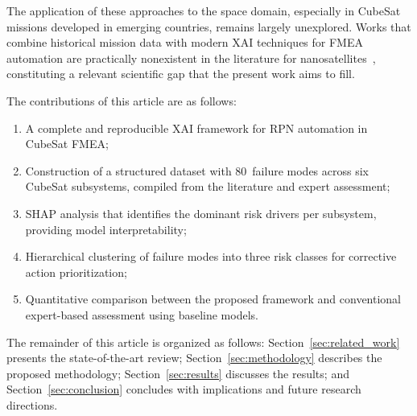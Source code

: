 The application of these approaches to the space domain, especially in CubeSat missions developed in emerging countries, remains largely unexplored. Works that combine historical mission data with modern XAI techniques for FMEA automation are practically nonexistent in the literature for nanosatellites~\cite{aadfmea2023}, constituting a relevant scientific gap that the present work aims to fill.

The contributions of this article are as follows:
\begin{enumerate}
\item A complete and reproducible XAI framework for RPN automation in CubeSat FMEA;
\item Construction of a structured dataset with 80~failure modes across six CubeSat subsystems, compiled from the literature and expert assessment;
\item SHAP analysis that identifies the dominant risk drivers per subsystem, providing model interpretability;
\item Hierarchical clustering of failure modes into three risk classes for corrective action prioritization;
\item Quantitative comparison between the proposed framework and conventional expert-based assessment using baseline models.
\end{enumerate}

The remainder of this article is organized as follows: Section~\ref{sec:related_work} presents the state-of-the-art review; Section~\ref{sec:methodology} describes the proposed methodology; Section~\ref{sec:results} discusses the results; and Section~\ref{sec:conclusion} concludes with implications and future research directions.